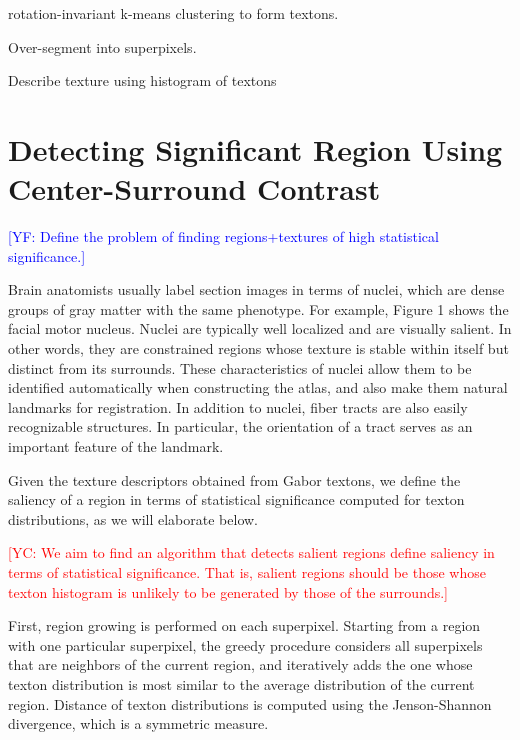\documentclass{llncs}
\newcommand{\authcmt}[2]{\textcolor{#1}{#2}}
\newcommand{\yuncong}[1]{\authcmt{red}{[YC: #1]}}
\newcommand{\yoav}[1]{\authcmt{blue}{[YF: #1]}}
\begin{document}


rotation-invariant k-means clustering to form textons.

Over-segment into superpixels.

Describe texture using histogram of textons

\section{Detecting Significant Region Using Center-Surround Contrast}

\yoav{Define the problem of finding regions+textures of high
  statistical significance.}


Brain anatomists usually label section images in terms of nuclei, which are dense groups of gray matter with the same phenotype. For example, Figure 1 shows the facial motor nucleus. Nuclei are typically well localized and are visually salient. In other words, they are constrained regions whose texture is stable within itself but distinct from its surrounds. These characteristics of nuclei allow them to be identified automatically when constructing the atlas, and also make them natural landmarks for registration. In addition to nuclei, fiber tracts are also easily recognizable structures. In particular, the orientation of a tract serves as an important feature of the landmark.

Given the texture descriptors obtained from Gabor textons, we define the saliency of a region in terms of statistical significance computed for texton distributions, as we will elaborate below.
 
\yuncong{We aim to find an algorithm that detects salient regions
define saliency in terms of statistical significance. That is, salient regions should be those whose texton histogram is unlikely to be generated by those of the surrounds.}
 
First, region growing is performed on each superpixel. Starting from a region with one particular superpixel, the greedy procedure considers all superpixels that are neighbors of the current region, and iteratively adds the one whose texton distribution is most similar to the average distribution of the current region. Distance of texton distributions is computed using the Jenson-Shannon divergence, which is a symmetric measure.
\end{document}
